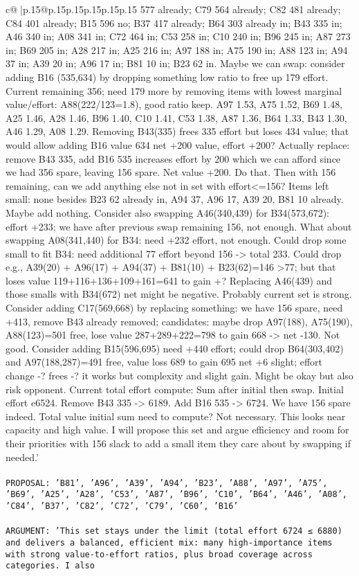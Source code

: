 \documentclass{article}
\begin{document}
{\begin{supertabular}{c@{$\;$}|p{.15\linewidth}@{}p{.15\linewidth}p{.15\linewidth}p{.15\linewidth}p{.15\linewidth}p{.15\linewidth}}
{{{577 already; C79 564 already; C82 481 already; C84 401 already; B15 596 no; B37 417 already; B64 303 already in; B43 335 in; A46 340 in; A08 341 in; C72 464 in; C53 258 in; C10 240 in; B96 245 in; A87 273 in; B69 205 in; A28 217 in; A25 216 in; A97 188 in; A75 190 in; A88 123 in; A94 37 in; A39 20 in; A96 17 in; B81 10 in; B23 62 in. Maybe we can swap: consider adding B16 (535,634) by dropping something low ratio to free up 179 effort. Current remaining 356; need 179 more by removing items with lowest marginal value/effort: A88(222/123=1.8), good ratio keep. A97 1.53, A75 1.52, B69 1.48, A25 1.46, A28 1.46, B96 1.40, C10 1.41, C53 1.38, A87 1.36, B64 1.33, B43 1.30, A46 1.29, A08 1.29. Removing B43(335) frees 335 effort but loses 434 value; that would allow adding B16 value 634 net +200 value, effort +200? Actually replace: remove B43 335, add B16 535 increases effort by 200 which we can afford since we had 356 spare, leaving 156 spare. Net value +200. Do that. Then with 156 remaining, can we add anything else not in set with effort<=156? Items left small: none besides B23 62 already in, A94 37, A96 17, A39 20, B81 10 already. Maybe add nothing. Consider also swapping A46(340,439) for B34(573,672): effort +233; we have after previous swap remaining 156, not enough. What about swapping A08(341,440) for B34: need +232 effort, not enough. Could drop some small to fit B34: need additional 77 effort beyond 156 -> total 233. Could drop e.g., A39(20) + A96(17) + A94(37) + B81(10) + B23(62)=146 >77; but that loses value 119+116+136+109+161=641 to gain +? Replacing A46(439) and those smalls with B34(672) net might be negative. Probably current set is strong. Consider adding C17(569,668) by replacing something: we have 156 spare, need +413, remove B43 already removed; candidates: maybe drop A97(188), A75(190), A88(123)=501 free, lose value 287+289+222=798 to gain 668 -> net -130. Not good. Consider adding B15(596,695) need +440 effort; could drop B64(303,402) and A97(188,287)=491 free, value loss 689 to gain 695 net +6 slight; effort change -? frees -? it works but complexity and slight gain. Might be okay but also risk opponent. Current total effort compute: Sum after initial then swap. Initial effort e6524. Remove B43 335 -> 6189. Add B16 535 -> 6724. We have 156 spare indeed. Total value initial sum need to compute? Not necessary. This looks near capacity and high value. I will propose this set and argue efficiency and room for their priorities with 156 slack to add a small item they care about by swapping if needed.'}\\ \tt \\ \tt PROPOSAL: {'B81', 'A96', 'A39', 'A94', 'B23', 'A88', 'A97', 'A75', 'B69', 'A25', 'A28', 'C53', 'A87', 'B96', 'C10', 'B64', 'A46', 'A08', 'C84', 'B37', 'C82', 'C72', 'C79', 'C60', 'B16'}\\ \tt \\ \tt ARGUMENT: {'This set stays under the limit (total effort 6724 ≤ 6880) and delivers a balanced, efficient mix: many high-importance items with strong value-to-effort ratios, plus broad coverage across categories. I also }}}
\end{supertabular}}
\end{document}
